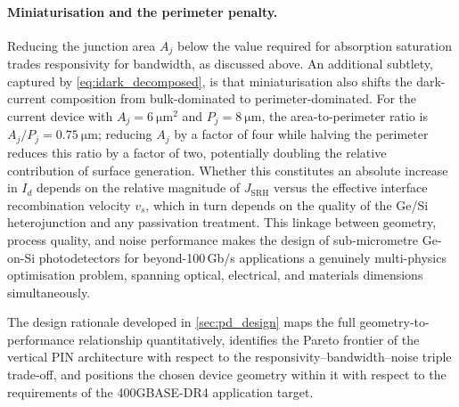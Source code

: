 \paragraph{Miniaturisation and the perimeter penalty.}
Reducing the junction area $A_j$ below the value required for absorption
saturation trades responsivity for bandwidth, as discussed above. An additional
subtlety, captured by \cref{eq:idark_decomposed}, is that miniaturisation also
shifts the dark-current composition from bulk-dominated to perimeter-dominated.
For the current device with $A_j = \SI{6}{\micro\metre\squared}$ and
$P_j = \SI{8}{\micro\metre}$, the area-to-perimeter ratio is
$A_j / P_j = \SI{0.75}{\micro\metre}$; reducing $A_j$ by a factor of four while
halving the perimeter reduces this ratio by a factor of two, potentially doubling
the relative contribution of surface generation. Whether this constitutes an
absolute increase in $I_d$ depends on the relative magnitude of $J_{\mathrm{SRH}}$
versus the effective interface recombination velocity $v_s$, which in turn
depends on the quality of the Ge/Si heterojunction and any passivation treatment.
This linkage between geometry, process quality, and noise performance makes the
design of sub-micrometre Ge-on-Si photodetectors for beyond-100\,Gb/s
applications a genuinely multi-physics optimisation problem, spanning optical,
electrical, and materials dimensions simultaneously.

The design rationale developed in \cref{sec:pd_design} maps the full
geometry-to-performance relationship quantitatively, identifies the Pareto
frontier of the vertical PIN architecture with respect to the
responsivity--bandwidth--noise triple trade-off, and positions the chosen device
geometry within it with respect to the requirements of the \mbox{400GBASE-DR4}
application target.
